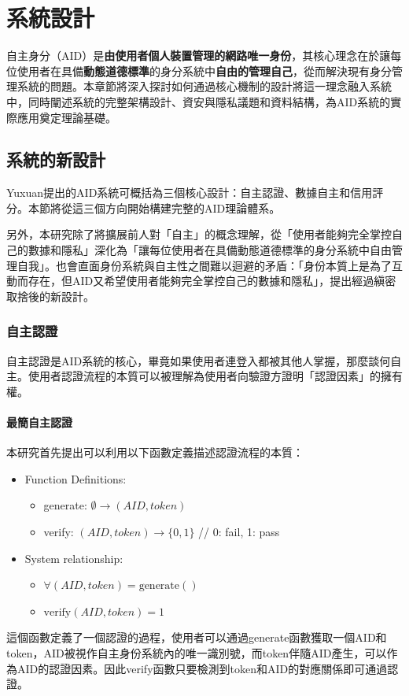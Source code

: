 
\chapter{系統設計}
自主身分（AID）是\textbf{由使用者個人裝置管理的網路唯一身份}，其核心理念在於讓每位使用者在具備\textbf{動態道德標準}的身分系統中\textbf{自由的管理自己}，從而解決現有身分管理系統的問題。本章節將深入探討如何通過核心機制的設計將這一理念融入系統中，同時闡述系統的完整架構設計、資安與隱私議題和資料結構，為AID系統的實際應用奠定理論基礎。
\section{系統的新設計}
Yuxuan\cite{ntu-lin2014autonomous}提出的AID系統可概括為三個核心設計：自主認證、數據自主和信用評分。本節將從這三個方向開始構建完整的AID理論體系。

另外，本研究除了將擴展前人對「自主」的概念理解，從「使用者能夠完全掌控自己的數據和隱私」深化為「讓每位使用者在具備動態道德標準的身分系統中自由管理自我」。也會直面身份系統與自主性之間難以迴避的矛盾：「身份本質上是為了互動而存在，但AID又希望使用者能夠完全掌控自己的數據和隱私」，提出經過縝密取捨後的新設計。
\subsection{自主認證}
自主認證是AID系統的核心，畢竟如果使用者連登入都被其他人掌握，那麼談何自主。使用者認證流程的本質可以被理解為使用者向驗證方證明「認證因素」\cite{AlQahtani2021AF}的擁有權。
\subsubsection{最簡自主認證}
本研究首先提出可以利用以下函數定義描述認證流程的本質：
\begin{itemize}
  \item Function Definitions:
        \begin{itemize}
          \item generate: $\emptyset \rightarrow (AID, token)$
          \item verify: $(AID, token) \rightarrow \{0,1\}$ \hfill // 0: fail, 1: pass
        \end{itemize}
  \item System relationship:
        \begin{itemize}
          \item $\forall(AID, token) = \text{generate}()$
          \item $\text{verify}(AID, token) = 1$
        \end{itemize}
\end{itemize}
這個函數定義了一個認證的過程，使用者可以通過generate函數獲取一個AID和token，AID被視作自主身份系統內的唯一識別號，而token伴隨AID產生，可以作為AID的認證因素。因此verify函數只要檢測到token和AID的對應關係即可通過認證。


